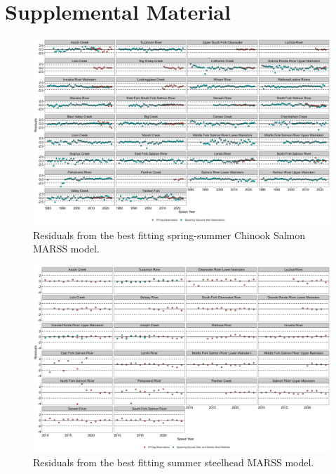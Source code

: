 \documentclass[12pt,a4paper]{article}
\begin{document}
\printbibliography[heading=none]
\def\printbibliography{}

\clearpage

\appendix
\renewcommand{\thefigure}{S\arabic{figure}}  %
\setcounter{figure}{0}

\section{Supplemental Material}\label{supplemental-material}

\begin{figure}[H]
\includegraphics[width=1\linewidth]{../figures/Chinook_salmon/Chinook_salmon_residuals_2024} \caption{Residuals from the best fitting spring-summer Chinook Salmon MARSS model.}\label{fig:chn-resids}
\end{figure}

\begin{figure}[H]
\includegraphics[width=1\linewidth]{../figures/Steelhead/Steelhead_residuals_2024} \caption{Residuals from the best fitting summer steelhead MARSS model.}\label{fig:sth-resids}
\end{figure}
\end{document}
